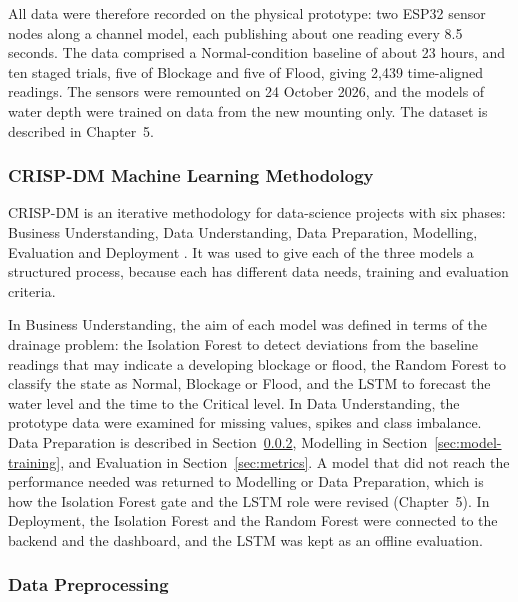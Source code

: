 \documentclass[12pt, a4paper]{article}
\begin{document}
All data were therefore recorded on the physical prototype: two ESP32 sensor nodes along a channel model, each publishing about one reading every 8.5 seconds. The data comprised a Normal-condition baseline of about 23 hours, and ten staged trials, five of Blockage and five of Flood, giving 2,439 time-aligned readings. The sensors were remounted on 24 October 2026, and the models of water depth were trained on data from the new mounting only. The dataset is described in Chapter~5.

\subsubsection{CRISP-DM Machine Learning Methodology}
\label{sec:crisp-dm}

CRISP-DM is an iterative methodology for data-science projects with six phases: Business Understanding, Data Understanding, Data Preparation, Modelling, Evaluation and Deployment \citep{wirth2000}. It was used to give each of the three models a structured process, because each has different data needs, training and evaluation criteria.

In Business Understanding, the aim of each model was defined in terms of the drainage problem: the Isolation Forest to detect deviations from the baseline readings that may indicate a developing blockage or flood, the Random Forest to classify the state as Normal, Blockage or Flood, and the LSTM to forecast the water level and the time to the Critical level. In Data Understanding, the prototype data were examined for missing values, spikes and class imbalance. Data Preparation is described in Section~\ref{sec:preprocessing}, Modelling in Section~\ref{sec:model-training}, and Evaluation in Section~\ref{sec:metrics}. A model that did not reach the performance needed was returned to Modelling or Data Preparation, which is how the Isolation Forest gate and the LSTM role were revised (Chapter~5). In Deployment, the Isolation Forest and the Random Forest were connected to the backend and the dashboard, and the LSTM was kept as an offline evaluation.

\subsubsection{Data Preprocessing}
\label{sec:preprocessing}
\end{document}
